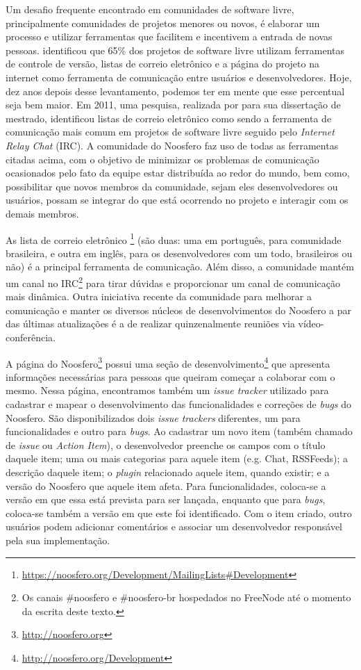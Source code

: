 Um desafio frequente encontrado em comunidades de software livre, principalmente
comunidades de projetos menores ou novos, é elaborar um processo e utilizar
ferramentas que facilitem e incentivem a entrada de novas pessoas.
 identificou que 65\% dos projetos de software livre
utilizam ferramentas de controle de versão, listas de correio eletrônico e a
página do projeto na internet como ferramenta de comunicação entre usuários e
desenvolvedores. Hoje, dez anos depois desse levantamento, podemos ter em mente
que esse percentual seja bem maior.
%
Em 2011, uma pesquisa, realizada por 
para sua dissertação de mestrado, identificou listas de correio eletrônico como
sendo a ferramenta de comunicação mais comum em projetos de software livre
seguido pelo \textit{Internet Relay Chat} (IRC).
%
A comunidade do Noosfero faz uso de todas as ferramentas citadas acima, com
o objetivo de minimizar os problemas de comunicação ocasionados pelo fato da
equipe estar distribuída ao redor do mundo, bem como, possibilitar que novos
membros da comunidade, sejam eles desenvolvedores ou usuários, possam se
integrar do que está ocorrendo no projeto e interagir com os demais membros.

As lista de correio eletrônico%
\footnote{\url{https://noosfero.org/Development/MailingLists\#Development}}
(são duas: uma em português, para comunidade brasileira, e outra em inglês,
para os desenvolvedores com um todo, brasileiros ou não) é a principal
ferramenta de comunicação.
%
Além disso, a comunidade mantém um canal no IRC\footnote{Os canais \#noosfero e
\#noosfero-br hospedados no FreeNode até o momento da escrita deste texto.}
para tirar dúvidas e proporcionar um canal de comunicação mais dinâmica.
%
Outra iniciativa recente da comunidade para melhorar a comunicação e manter os
diversos núcleos de desenvolvimentos do Noosfero a par das últimas atualizações
é a de realizar quinzenalmente reuniões via vídeo-conferência.

A página do Noosfero\footnote{\url{http://noosfero.org}} possui uma seção de
desenvolvimento\footnote{\url{http://noosfero.org/Development}} que apresenta
informações necessárias para pessoas que queiram começar a colaborar com o
mesmo. Nessa página, encontramos também um \textit{issue tracker} utilizado para
cadastrar e mapear o desenvolvimento das funcionalidades e correções de
\textit{bugs} do Noosfero.
%
São disponibilizados dois \textit{issue trackers} diferentes, um para
funcionalidades e outro para \textit{bugs}. Ao cadastrar um novo item
(também chamado de \textit{issue} ou \textit{Action Item}), o
desenvolvedor preenche os campos com o título daquele item; uma ou mais
categorias para aquele item (e.g. Chat, RSSFeeds); a descrição daquele
item; o \textit{plugin} relacionado aquele item, quando existir; e a
versão do Noosfero que aquele item afeta.
%
Para funcionalidades, coloca-se a
versão em que essa está prevista para ser lançada, enquanto que para
\textit{bugs}, coloca-se também a versão em que este foi identificado. Com o
item criado, outro usuários podem adicionar comentários e associar um
desenvolvedor responsável pela sua implementação.


